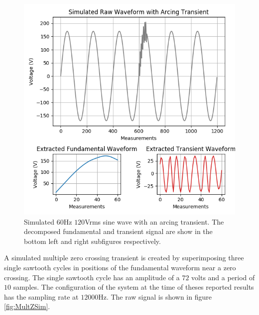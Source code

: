 \documentclass[10pt, conference, compsocconf]{IEEEtran}
\begin{document}
\begin{figure}[h]
\centering%
\includegraphics[scale=0.35]{./figures/arcing_sim.png}
\caption{Simulated $60$Hz $120$Vrms sine wave with an arcing transient. The decomposed fundamental and transient signal are show in the bottom left and right subfigures respectively.}\label{fig:ArcingSim}
\end{figure}


A simulated multiple zero crossing transient is created by superimposing three single sawtooth cycles in positions of the fundamental waveform near a zero crossing. The single sawtooth cycle has an amplitude of a $72$ volts and a period of $10$ samples. The configuration of the system at the time of theses reported results has the sampling rate at $12000$Hz. The raw signal is shown in figure \ref{fig:MultZSim}.
\end{document}

